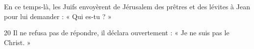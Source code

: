 En ce temps-là, les Juifs envoyèrent de Jérusalem des prêtres et des lévites à Jean pour lui demander : « Qui es-tu ? »

20 Il ne refusa pas de répondre, il déclara ouvertement : « Je ne suis pas le Christ. »